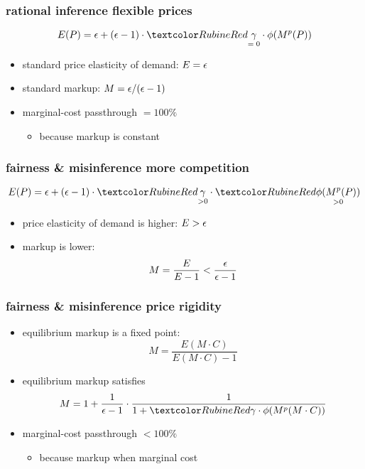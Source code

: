 \documentclass[12pt,xcolor={dvipsnames},hyperref={pdftex,pdfpagemode=UseNone,hidelinks,pdfdisplaydoctitle=true},usepdftitle=false]{beamer}
\begin{document}
\begin{frame}
\frametitle{rational inference \then flexible prices}
\begin{equation*}
E(P) = \e+ (\e-1)\cdot \al{\underset{=\;0}{\g}}\cdot \f(M^p(P))
\end{equation*}
\begin{itemize}
\item standard price elasticity of demand: $E=\epsilon$
\item standard markup: $M=\epsilon/(\epsilon-1)$
\item marginal-cost passthrough $= 100\%$
\begin{itemize}
\item because markup is constant
\end{itemize}
\end{itemize}
\end{frame}

\begin{frame}
\frametitle{fairness \& misinference \then more competition}
\begin{equation*}
E(P) = \e+ (\e-1)\cdot \al{\underset{>0}{\g}} \cdot \al{\underset{>0}{\f(M^p(P))}}
\end{equation*}
\begin{itemize}
\item price elasticity of demand is higher: $E>\epsilon$
\item markup is lower:
\begin{equation*}
M = \frac{E}{E-1} < \frac{\epsilon}{\epsilon-1}
\end{equation*}
\end{itemize}
\end{frame}

\begin{frame}
\frametitle{fairness \& misinference \then price rigidity}
\begin{itemize}
\item equilibrium markup is a fixed point:
\begin{equation*}
M = \frac{E(M \cdot C)}{E(M \cdot C)-1}
\end{equation*}
\item  equilibrium markup satisfies
\begin{equation*}
M=1+\frac{1}{\e-1}\cdot \frac{1}{1+\al{\g \cdot\f(M^p(M \cdot C))}}
\end{equation*}
\item[\then] marginal-cost passthrough $< 100\%$
\begin{itemize}
\item because markup \down when marginal cost \up
\end{itemize}
\end{itemize}
\end{frame}
\end{document}
